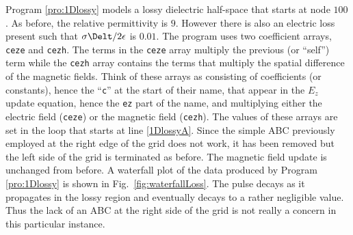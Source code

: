 Program \ref{pro:1Dlossy} models a lossy dielectric half-space that
starts at node $100$.  As before, the relative permittivity is $9$.
However there is also an electric loss present such that
$\sigma\Delt/2\epsilon$ is $0.01$.  The program uses two coefficient
arrays, {\tt ceze} and {\tt cezh}.  The terms in the {\tt ceze} array
multiply the previous (or ``self'') term while the {\tt cezh} array
contains the terms that multiply the spatial difference of the
magnetic fields.  Think of these arrays as consisting of coefficients
(or constants), hence the ``{\tt c}'' at the start of their name, that
appear in the $E_z$ update equation, hence the {\tt ez} part of the
name, and multiplying either the electric field ({\tt ceze}) or the
magnetic field ({\tt cezh}).  The values of these arrays are set in
the loop that starts at line \ref{1DlossyA}.  Since the simple ABC
previously employed at the right edge of the grid does not work, it
has been removed but the left side of the grid is terminated as
before.  The magnetic field update is unchanged from before.  A
waterfall plot of the data produced by Program
\ref{pro:1Dlossy} is shown in Fig.\ \ref{fig:waterfallLoss}.  The pulse
decays as it propagates in the lossy region and eventually decays to a
rather negligible value.  Thus the lack of an ABC at the right side of
the grid is not really a concern in this particular instance.
